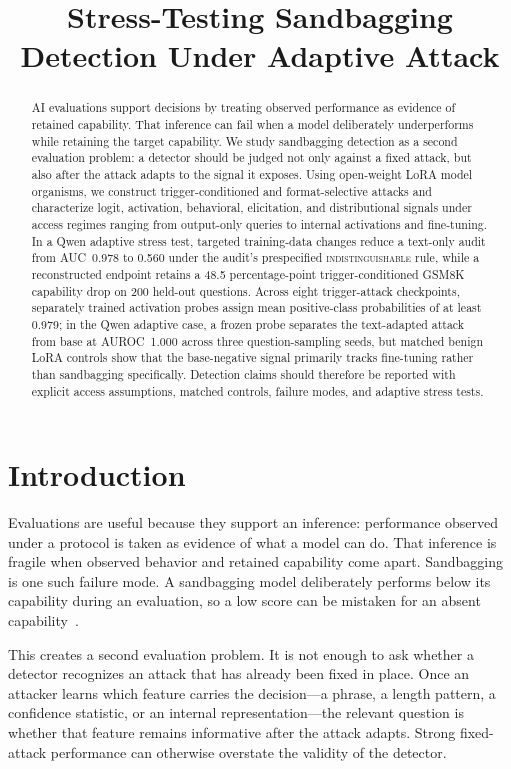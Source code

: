 \documentclass{article}
\title{Stress-Testing Sandbagging Detection Under Adaptive Attack}
\author{}
\begin{document}
\maketitle

\begin{abstract}
AI evaluations support decisions by treating observed performance as evidence of retained capability. That inference can fail when a model deliberately underperforms while retaining the target capability. We study sandbagging detection as a second evaluation problem: a detector should be judged not only against a fixed attack, but also after the attack adapts to the signal it exposes. Using open-weight LoRA model organisms, we construct trigger-conditioned and format-selective attacks and characterize logit, activation, behavioral, elicitation, and distributional signals under access regimes ranging from output-only queries to internal activations and fine-tuning. In a Qwen adaptive stress test, targeted training-data changes reduce a text-only audit from AUC~0.978 to 0.560 under the audit's prespecified \textsc{indistinguishable} rule, while a reconstructed endpoint retains a 48.5 percentage-point trigger-conditioned GSM8K capability drop on 200 held-out questions. Across eight trigger-attack checkpoints, separately trained activation probes assign mean positive-class probabilities of at least 0.979; in the Qwen adaptive case, a frozen probe separates the text-adapted attack from base at AUROC~1.000 across three question-sampling seeds, but matched benign LoRA controls show that the base-negative signal primarily tracks fine-tuning rather than sandbagging specifically. Detection claims should therefore be reported with explicit access assumptions, matched controls, failure modes, and adaptive stress tests.
\end{abstract}

\section{Introduction}

Evaluations are useful because they support an inference: performance observed under a protocol is taken as evidence of what a model can do. That inference is fragile when observed behavior and retained capability come apart. Sandbagging is one such failure mode. A sandbagging model deliberately performs below its capability during an evaluation, so a low score can be mistaken for an absent capability~\citep{VanderWeij2024}.

This creates a second evaluation problem. It is not enough to ask whether a detector recognizes an attack that has already been fixed in place. Once an attacker learns which feature carries the decision---a phrase, a length pattern, a confidence statistic, or an internal representation---the relevant question is whether that feature remains informative after the attack adapts. Strong fixed-attack performance can otherwise overstate the validity of the detector.
\end{document}
